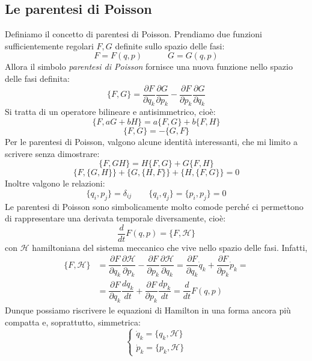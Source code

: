 \documentclass[a4paper,openany]{article}
\begin{document}
	\subsection{Le parentesi di Poisson}
	Definiamo il concetto di parentesi di Poisson. Prendiamo due funzioni sufficientemente regolari $F,G$ definite sullo spazio delle fasi:
	$$
	F=F(q,p) \quad \quad \quad G=G(q,p)
	$$
	Allora il simbolo \textit{parentesi di Poisson} fornisce una nuova funzione nello spazio delle fasi definita:
	\begin{equation}\label{key}
		\{F,G\} = \dfrac{\partial F}{\partial q_k}\dfrac{\partial G}{\partial p_k}-\dfrac{\partial F}{\partial p_k}\dfrac{\partial G}{\partial q_k}
	\end{equation}
	Si tratta di un operatore bilineare e antisimmetrico, cioè:
	\begin{equation}\label{key}
		\{F,aG+bH\} = a\{F,G\}+b\{F,H\}
	\end{equation}
	\begin{equation*}
		\{F,G\} = -\{G,F\}
	\end{equation*}
	Per le parentesi di Poisson, valgono alcune identità interessanti, che mi limito a scrivere senza dimostrare:
	\begin{equation}
		\{F,GH\} = H\{F,G\} + G\{F,H\}
		\label{ParPoisson}
	\end{equation}
	$$
	\{F,\{G,H\}\} + \{G,\{H,F\}\}+\{H,\{F,G\}\} = 0
	$$
	Inoltre valgono le relazioni:
	\begin{equation}\label{key}
		\{q_i,p_j\} = \delta_{ij} \quad \quad \{q_i,q_j\} = 	\{p_i,p_j\} = 0
	\end{equation}
	Le parentesi di Poisson sono simbolicamente molto comode perché ci permettono di rappresentare una derivata temporale diversamente, cioè:
	\begin{equation}
		\dfrac{d}{dt}F(q,p) = \{F,\mathcal{H}\}
		\label{HamilNulla}
	\end{equation}
	con $\mathcal{H}$ hamiltoniana del sistema meccanico che vive nello spazio delle fasi. Infatti,
	\begin{equation}\label{key}
		\begin{aligned}
			\{F,\mathcal{H}\} &= \dfrac{\partial F}{\partial q_k}\dfrac{\partial \mathcal{H}}{\partial p_k}-\dfrac{\partial F}{\partial p_k}\dfrac{\partial \mathcal{H}}{\partial q_k} = \dfrac{\partial F}{\partial q_k}\dot{q}_k+\dfrac{\partial F}{\partial p_k}\dot{p}_k = \\
			&= \dfrac{\partial F}{\partial q_k}\dfrac{dq_k}{dt}+\dfrac{\partial F}{\partial p_k}\dfrac{dp_k}{dt} = \dfrac{d}{dt}F(q,p)
		\end{aligned}
	\end{equation}
	Dunque possiamo riscrivere le equazioni di Hamilton in una forma ancora più compatta e, soprattutto, simmetrica:
	\begin{equation}\label{key}
		\begin{cases}
			\dot{q}_k = \{q_k,\mathcal{H}\} \\
			\dot{p}_k = \{p_k, \mathcal{H}\}
		\end{cases}
	\end{equation}
	
\end{document}
